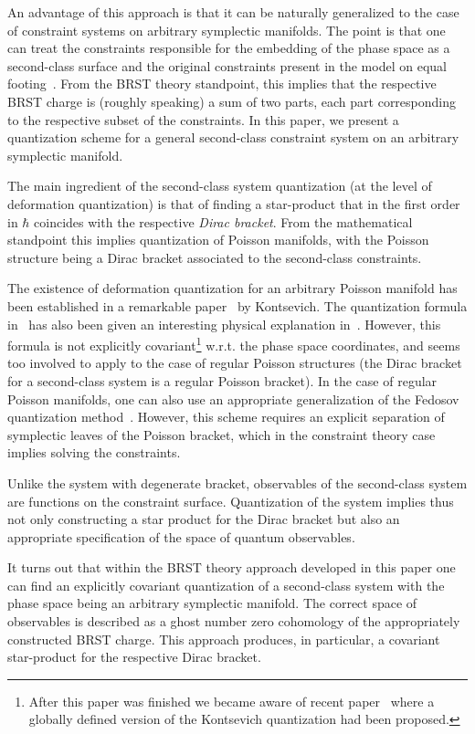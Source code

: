 \documentclass[a4paper,11pt]{amsart}
\numberwithin{thm}{section} %
\numberwithin{equation}{section} %
\numberwithin{figure}{section} %
\renewcommand{\:}{{\rm\, :\,}}
\begin{document}
An advantage of this approach is that it can be naturally generalized
to the case of constraint systems on arbitrary symplectic manifolds.
The point is that one can treat the constraints responsible for the
embedding of the phase space as a second-class surface and the
original constraints present in the model on equal
footing~\cite{[BFF]}.  {}From the BRST theory standpoint, this implies
that the respective BRST charge is (roughly speaking) a sum of two
parts, each part corresponding to the respective subset of the
constraints.  In this paper, we present a quantization scheme for a
general second-class constraint system on an arbitrary symplectic
manifold.


The main ingredient of the second-class system quantization (at the
level of deformation quantization) is that of finding a star-product
that in the first order in $\hbar$ coincides with the respective
\textit{Dirac bracket}.  {}From the mathematical standpoint this
implies quantization of Poisson manifolds, with the Poisson structure
being a Dirac bracket associated to the second-class constraints.

The existence of deformation quantization for an arbitrary Poisson
manifold has been established in a remarkable
paper~\cite{[Kontsevich]} by Kontsevich. The quantization formula
in~\cite{[Kontsevich]} has also been given an interesting physical
explanation in~\cite{[CF]}.  However, this formula is not explicitly
covariant\footnote{After this paper was finished we became aware of
  recent paper~\cite{[CFT]} where a globally defined version of the
  Kontsevich quantization had been proposed.} w.r.t. the phase space
coordinates, and seems too involved to apply to the case of regular
Poisson structures (the Dirac bracket for a second-class system is a
regular Poisson bracket).  In the case of regular Poisson manifolds,
one can also use an appropriate generalization of the Fedosov
quantization method~\cite{[Fedosov-book]}.  However, this scheme
requires an explicit separation of symplectic leaves of the Poisson
bracket, which in the constraint theory case implies solving the
constraints.

Unlike the system with degenerate bracket, observables
of the second-class system are functions on the constraint
surface.  Quantization of the system implies thus not only constructing
a star product for the Dirac bracket but also an appropriate
specification of the space of quantum observables.


It turns out that within the BRST theory approach
developed in this paper one can find an explicitly covariant
quantization of a second-class system with the phase space being
an arbitrary symplectic manifold.  The correct space of observables is
described as a ghost number zero cohomology of the appropriately
constructed BRST charge.  This approach produces, in particular, a
covariant star-product for the respective Dirac bracket.
\end{document}
